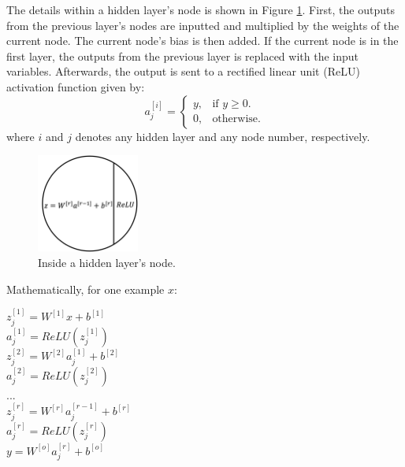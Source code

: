 The details within a hidden layer's node is shown in Figure \ref{fig:08NNNode}. First, the outputs from the previous layer's nodes are inputted and multiplied by the weights of the current node.  The current node's bias is then added. If the current node is in the first layer, the outputs from the previous layer is replaced with the input variables. Afterwards, the output is sent to a rectified linear unit (ReLU) activation function given by:
\begin{equation}
    a^{[i]}_j=\begin{cases}
        y, & \text{if $y\geq0$}.\\
        0, & \text{otherwise}.
    \end{cases}
    \label{eq:08ReLU}
\end{equation}
where $i$ and $j$ denotes any hidden layer and any node number, respectively.  
\begin{figure}[h]
    \centering
    \includegraphics[width=0.3\textwidth]{images/08NNNode.png}
    \caption{Inside a hidden layer's node.}
    \label{fig:08NNNode}
\end{figure}

Mathematically, for one example $x$:
\begin{center}
    $z^{[1]}_j = W^{[1]}x + b^{[1]}$ \\
    $a^{[1]}_j = ReLU(z^{[1]}_j)$ \\
    $z^{[2]}_j = W^{[2]}a^{[1]}_j + b^{[2]}$ \\
    $a^{[2]}_j = ReLU(z^{[2]}_j)$ \\
    ... \\
    $z^{[r]}_j = W^{[r]}a^{[r - 1]}_j + b^{[r]}$ \\
    $a^{[r]}_j = ReLU(z^{[r]}_j)$ \\
    $y = W^{[o]}a^{[r]}_j + b^{[o]}$ \\  
\end{center}


